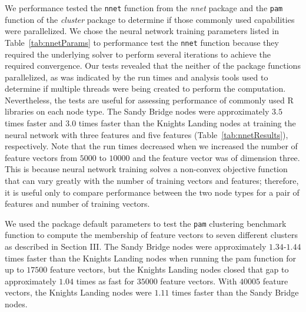 We performance tested the \texttt{nnet} function from the \textit{nnet} package
  and the \texttt{pam} function of the \textit{cluster} package to determine if
  those commonly used capabilities were parallelized.
We chose the neural network training parameters listed in Table~\ref{tab:nnetParams} to
  performance test the \texttt{nnet} function because they required the
  underlying solver to perform several iterations to achieve the required
  convergence.
Our tests revealed that the neither of the package functions parallelized, as
  was indicated by the run times and analysis tools used to determine if
  multiple threads were being created to perform the computation.
Nevertheless, the tests are useful for assessing performance of commonly used R
  libraries on each node type.
The Sandy Bridge nodes were approximately $3.5$ times faster and $3.0$ times
  faster than the Knights Landing nodes at training the neural network with
  three features and five features (Table~\ref{tab:nnetResults}), respectively.
Note that the run times decreased when we increased the number of feature
  vectors from $5000$ to $10000$ and the feature vector was of dimension three.
This is because neural network training solves a non-convex objective function
  that can vary greatly with the number of training vectors and features;
  therefore, it is useful only to compare performance between the two node types
  for a pair of features and number of training vectors.

We used the package default parameters to test the \texttt{pam} clustering
  benchmark function to compute the membership of feature vectors to seven
  different clusters as described in Section III.
The Sandy Bridge nodes were approximately $1.34$-$1.44$ times faster than the
  Knights Landing nodes when running the pam function for up to $17500$ feature
  vectors, but the Knights Landing nodes closed that gap to approximately $1.04$
  times as fast for $35000$ feature vectors.
With $40005$ feature vectors, the Knights Landing nodes were $1.11$ times faster
  than the Sandy Bridge nodes.

